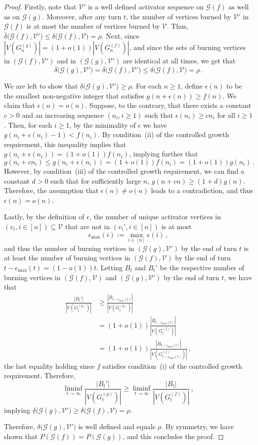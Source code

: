 \documentclass[10pt,a4paper]{amsart}
\newcommand\cG{\mathcal G}
\newcommand\cV{\mathcal V}
\begin{document}
\begin{proof}
Firstly, note that $\cV'$ is a well defined activator sequence on $\cG(f)$ as well as on $\cG(g)$. Moreover, after any turn $t$, the number of vertices burned by $\cV'$ in $\cG(f)$ is at most the number of vertices burned by $\cV$. Thus, $\overline{\delta}\big( \cG(f), \cV' \big) \leq \delta\big( \cG(f), \cV \big) = \rho$. Next, since $|V(G^{(g)}_n)| = (1+o(1))|V(G^{(f)}_n)|$, and since the sets of burning vertices in $(\cG(f),\cV')$ and in $(\cG(g),\cV')$ are identical at all times, we get that 
\[
\overline{\delta}\big( \cG(g), \cV' \big) = \overline{\delta}\big( \cG(f), \cV' \big) \leq \delta\big( \cG(f), \cV \big) = \rho \,.
\]

We are left to show that $\underline{\delta}\big( \cG(g), \cV' \big) \geq \rho$. For each $n \geq 1$, define $\epsilon(n)$ to be the smallest non-negative integer that satisfies $g(n+\epsilon(n)) \geq f(n)$. We claim that $\epsilon(n) = o(n)$. Suppose, to the contrary, that there exists a constant $c > 0$ and an increasing sequence $(n_i,i\geq 1)$ such that $\epsilon(n_i) \geq cn_i$ for all $i \geq 1$. Then, for each $i \geq 1$, by the minimality of $\epsilon$ we have $g(n_i+\epsilon(n_i)-1) < f(n_i)$. By condition~(ii) of the controlled growth requirement, this inequality implies that $g(n_i+\epsilon(n_i)) = (1+o(1)) f(n_i)$, implying further that 
\[
g(n_i + cn_i) \leq g(n_i+\epsilon(n_i)) = (1+o(1))f(n_i) = (1+o(1))g(n_i) \,.
\] 
However, by condition~(iii) of the controlled growth requirement, we can find a constant $d > 0$ such that for sufficiently large $n$, $g(n + cn) \geq (1+d)g(n)$. Therefore, the assumption that $\epsilon(n) \neq o(n)$ leads to a contradiction, and thus $\epsilon(n) = o(n)$.

Lastly, by the definition of $\epsilon$, the number of unique activator vertices in $(v_i,i \in [n]) \subseteq \cV$ that are not in $(v_i',i \in [n])$ is at most
\[
\epsilon_{\max}(i) := \max_{i \in [n]} \epsilon(i) \,,
\]
and thus the number of burning vertices in $(\cG(g),\cV')$ by the end of turn $t$ is at least the number of burning vertices in $(\cG(f),\cV)$ by the end of turn $t-\epsilon_{\max}(t) = (1-o(1))t$. Letting $B_t$ and $B_t'$ be the respective number of burning vertices in $(\cG(f),\cV)$ and $(\cG(g),\cV')$ by the end of turn $t$, we have that 
\begin{align*}
\frac{|B_t'|}{|V(G^{(g)}_t)|}
&\geq
\frac{|B_{t-\epsilon_{\max}(t)}|}{|V(G^{(g)}_t)|}\\
&= 
(1+o(1))\frac{|B_{t-\epsilon_{\max}(t)}|}{|V(G^{(f)}_t)|}\\
&= 
(1+o(1))\frac{|B_{t-\epsilon_{\max}(t)}|}{|V(G^{(f)}_{t-\epsilon_{\max}(t)})|} \,,
\end{align*}
the last equality holding since $f$ satisfies condition~(i) of the controlled growth requirement. Therefore,
\[
\liminf_{t \to \infty} \frac{|B_t'|}{|V(G^{(g)}_t)|}
\geq
\liminf_{t \to \infty} \frac{|B_t|}{|V(G^{(f)}_t)|} \,,
\]
implying $\underline{\delta}\big( \cG(g), \cV' \big) \geq \delta\big( \cG(f), \cV \big) = \rho$.

Therefore, $\delta \big( \cG(g), \cV' \big)$ is well defined and equals $\rho$. By symmetry, we have shown that $P(\cG(f)) = P(\cG(g))$, and this concludes the proof.  
\end{proof}
\end{document}
